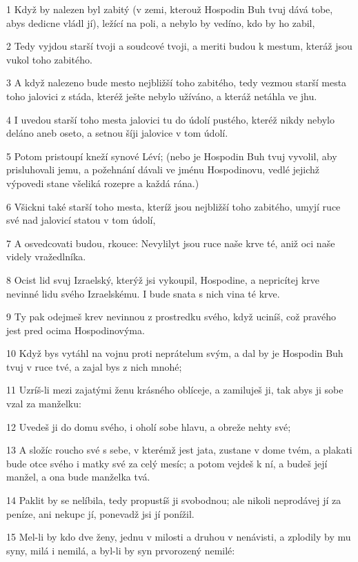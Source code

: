 \par 1 Když by nalezen byl zabitý (v zemi, kterouž Hospodin Buh tvuj dává tobe, abys dedicne vládl jí), ležící na poli, a nebylo by vedíno, kdo by ho zabil,
\par 2 Tedy vyjdou starší tvoji a soudcové tvoji, a meriti budou k mestum, kteráž jsou vukol toho zabitého.
\par 3 A když nalezeno bude mesto nejbližší toho zabitého, tedy vezmou starší mesta toho jalovici z stáda, kteréž ješte nebylo užíváno, a kteráž netáhla ve jhu.
\par 4 I uvedou starší toho mesta jalovici tu do údolí pustého, kteréž nikdy nebylo deláno aneb oseto, a setnou šíji jalovice v tom údolí.
\par 5 Potom pristoupí kneží synové Léví; (nebo je Hospodin Buh tvuj vyvolil, aby prisluhovali jemu, a požehnání dávali ve jménu Hospodinovu, vedlé jejichž výpovedi stane všeliká rozepre a každá rána.)
\par 6 Všickni také starší toho mesta, kteríž jsou nejbližší toho zabitého, umyjí ruce své nad jalovicí statou v tom údolí,
\par 7 A osvedcovati budou, rkouce: Nevylilyt jsou ruce naše krve té, aniž oci naše videly vražedlníka.
\par 8 Ocist lid svuj Izraelský, kterýž jsi vykoupil, Hospodine, a nepricítej krve nevinné lidu svého Izraelskému. I bude snata s nich vina té krve.
\par 9 Ty pak odejmeš krev nevinnou z prostredku svého, když uciníš, což pravého jest pred ocima Hospodinovýma.
\par 10 Když bys vytáhl na vojnu proti neprátelum svým, a dal by je Hospodin Buh tvuj v ruce tvé, a zajal bys z nich mnohé;
\par 11 Uzríš-li mezi zajatými ženu krásného oblíceje, a zamiluješ ji, tak abys ji sobe vzal za manželku:
\par 12 Uvedeš ji do domu svého, i oholí sobe hlavu, a obreže nehty své;
\par 13 A složíc roucho své s sebe, v kterémž jest jata, zustane v dome tvém, a plakati bude otce svého i matky své za celý mesíc; a potom vejdeš k ní, a budeš její manžel, a ona bude manželka tvá.
\par 14 Paklit by se nelíbila, tedy propustíš ji svobodnou; ale nikoli neprodávej jí za peníze, ani nekupc jí, ponevadž jsi jí ponížil.
\par 15 Mel-li by kdo dve ženy, jednu v milosti a druhou v nenávisti, a zplodily by mu syny, milá i nemilá, a byl-li by syn prvorozený nemilé:
